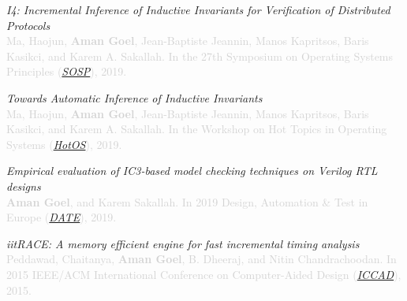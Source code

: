 \documentclass[line,margin,letter]{resume}
\begin{document}
\begin{resume}
\hspace{-2em} \href{https://sosp19.rcs.uwaterloo.ca/program.html}{\faFilePdfO} \hspace{0.3em}
\textit{I4: Incremental Inference of Inductive Invariants for Verification of Distributed Protocols} \\
\textcolor{lightgray}{Ma, Haojun, \textbf{Aman Goel}, Jean-Baptiste Jeannin, Manos Kapritsos, Baris Kasikci, and Karem A. Sakallah. In the 27th Symposium on Operating Systems Principles (\href{https://sosp19.rcs.uwaterloo.ca/}{\textit{SOSP}}), 2019.}

\hspace{-2em} \href{https://dl.acm.org/citation.cfm?id=3321451}{\faFilePdfO} \hspace{0.3em}
\textit{Towards Automatic Inference of Inductive Invariants} \\
\textcolor{lightgray}{Ma, Haojun, \textbf{Aman Goel}, Jean-Baptiste Jeannin, Manos Kapritsos, Baris Kasikci, and Karem A. Sakallah. In the Workshop on Hot Topics in Operating Systems (\href{https://hotos19.sigops.org/}{\textit{HotOS}}), 2019.}

\hspace{-2em} \href{https://ieeexplore.ieee.org/abstract/document/8715289}{\faFilePdfO} \hspace{0.3em}
\textit{Empirical evaluation of IC3-based model checking techniques on Verilog RTL designs} \\
\textcolor{lightgray}{\textbf{Aman Goel}, and Karem Sakallah. In 2019 Design, Automation \& Test in Europe (\href{https://www.date-conference.com/}{\textit{DATE}}), 2019.}

\hspace{-2em} \href{https://ieeexplore.ieee.org/abstract/document/7372667}{\faFilePdfO} \hspace{0.3em}
\textit{iitRACE: A memory efficient engine for fast incremental timing analysis} \\
\textcolor{lightgray}{Peddawad, Chaitanya, \textbf{Aman Goel}, B. Dheeraj, and Nitin Chandrachoodan. In 2015 IEEE/ACM International Conference on Computer-Aided Design (\href{https://iccad.com/}{\textit{ICCAD}}), 2015.}


\end{resume}
\end{document}
